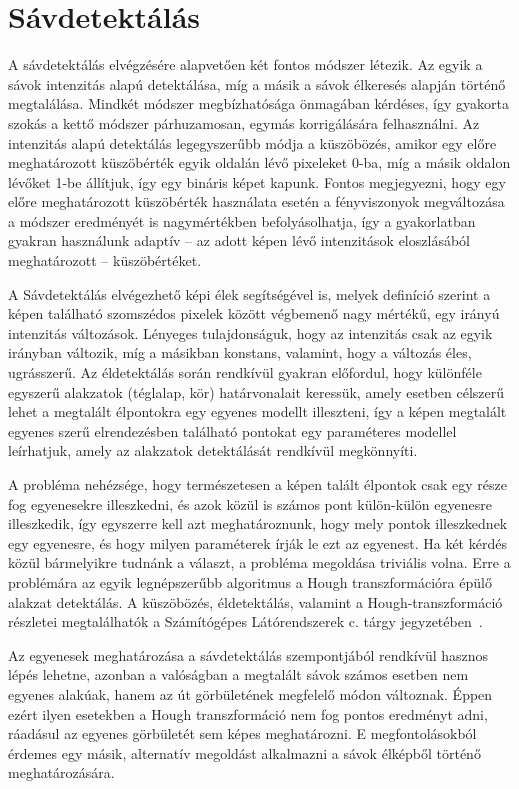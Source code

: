 \documentclass[12pt,a4paper,oneside]{report}             %
\begin{document}
\section{Sávdetektálás}

A sávdetektálás elvégzésére alapvetően két fontos módszer létezik. Az egyik a sávok intenzitás alapú detektálása, míg a másik a sávok élkeresés alapján történő megtalálása. Mindkét módszer megbízhatósága önmagában kérdéses, így gyakorta szokás a kettő módszer párhuzamosan, egymás korrigálására felhasználni. Az intenzitás alapú detektálás legegyszerűbb módja a küszöbözés, amikor egy előre meghatározott küszöbérték egyik oldalán lévő pixeleket 0-ba, míg a másik oldalon lévőket 1-be állítjuk, így egy bináris képet kapunk. Fontos megjegyezni, hogy egy előre meghatározott küszöbérték használata esetén a fényviszonyok megváltozása a módszer eredményét is nagymértékben befolyásolhatja, így a gyakorlatban gyakran használunk adaptív – az adott képen lévő intenzitások eloszlásából meghatározott – küszöbértéket. 

A Sávdetektálás elvégezhető képi élek segítségével is, melyek definíció szerint a képen található szomszédos pixelek között végbemenő nagy mértékű, egy irányú intenzitás változások. Lényeges tulajdonságuk, hogy az intenzitás csak az egyik irányban változik, míg a másikban konstans, valamint, hogy a változás éles, ugrásszerű. Az éldetektálás során rendkívül gyakran előfordul, hogy különféle egyszerű alakzatok (téglalap, kör) határvonalait keressük, amely esetben célszerű lehet a megtalált élpontokra egy egyenes modellt illeszteni, így a képen megtalált egyenes szerű elrendezésben található pontokat egy paraméteres modellel leírhatjuk, amely az alakzatok detektálását rendkívül megkönnyíti.

A probléma nehézsége, hogy természetesen a képen talált élpontok csak egy része fog egyenesekre illeszkedni, és azok közül is számos pont külön-külön egyenesre illeszkedik, így egyszerre kell azt meghatároznunk, hogy mely pontok illeszkednek egy egyenesre, és hogy milyen paraméterek írják le ezt az egyenest. Ha két kérdés közül bármelyikre tudnánk a választ, a probléma megoldása triviális volna.
 Erre a problémára az egyik legnépszerűbb algoritmus a Hough transzformációra épülő alakzat detektálás. A küszöbözés, éldetektálás, valamint a Hough-transzformáció részletei megtalálhatók a Számítógépes Látórendszerek c. tárgy jegyzetében~\cite{szgl}.

Az egyenesek meghatározása a sávdetektálás szempontjából rendkívül hasznos lépés lehetne, azonban a valóságban a megtalált sávok számos esetben nem egyenes alakúak, hanem az út görbületének megfelelő módon változnak. Éppen ezért ilyen esetekben a Hough transzformáció nem fog pontos eredményt adni, ráadásul az egyenes görbületét sem képes meghatározni. E megfontolásokból érdemes egy másik, alternatív megoldást alkalmazni a sávok élképből történő meghatározására. 
\end{document}
